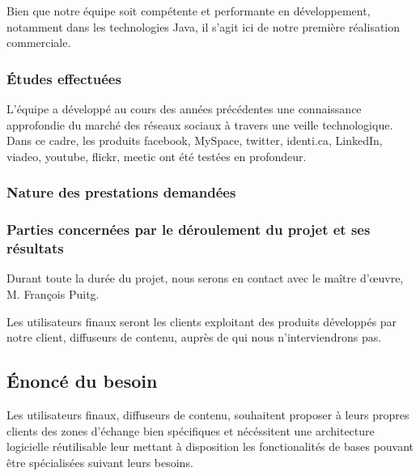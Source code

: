 Bien que notre équipe soit compétente et performante en développement, notamment dans les technologies Java, il s'agit ici de notre première réalisation commerciale.

\subsubsection{Études effectuées}

L'équipe a développé au cours des années précédentes une connaissance approfondie du marché des réseaux sociaux à travers une veille technologique. Dans ce cadre, les produits facebook, MySpace, twitter, identi.ca, LinkedIn, viadeo, youtube, flickr, meetic ont été testées en profondeur.

\subsubsection{Nature des prestations demandées}


\subsubsection{Parties concernées par le déroulement du projet et ses résultats}

Durant toute la durée du projet, nous serons en contact avec le maître d'œuvre, M. François Puitg.

Les utilisateurs finaux seront les clients exploitant des produits développés par notre client, diffuseurs de contenu, auprès de qui nous n'interviendrons pas.

\subsection{Énoncé du besoin}
Les utilisateurs finaux, diffuseurs de contenu, souhaitent proposer à leurs propres clients des zones d'échange bien spécifiques et nécéssitent une architecture logicielle réutilisable leur mettant à disposition les fonctionalités de bases pouvant être spécialisées suivant leurs besoins.


